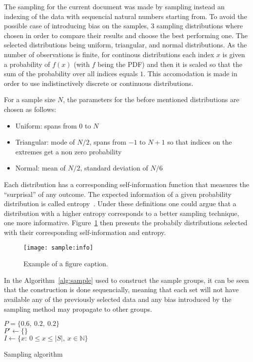\documentclass[journal]{IEEEtran}
\begin{document}
The sampling for the current document was made by sampling instead an indexing
of the data with sequencial natural numbers starting from. To avoid the possible
case of introducing bias on the samples, $3$ sampling distributions where chosen
in order to compare their results and choose the best performing one. The
selected distributions being uniform, triangular, and normal distributions. As
the number of observations is finite, for continous distributions each index $x$
is given a probability of $f(x)$ (with $f$ being the PDF) and then it is scaled
so that the sum of the probability over all indices equals $1$. This
accomodation is made in order to use indistinctively discrete or continuous
distributions.

For a sample size $N$, the parameters for the before mentioned distributions 
are chosen as follows:
\begin{itemize}
    \item Uniform: spans from $0$ to $N$
    \item Triangular: mode of $N/2$, spans from $-1$ to $N+1$ so that indices on
        the extremes get a non zero probability
    \item Normal: mean of $N/2$, standard deviation of $N/6$
\end{itemize} 

Each distribution has a corresponding self-information function that measures
the ``surprisal'' of any outcome. The expected information of a given
probability distribution is called entropy~\cite{information:borda}. Under these
definitions one could argue that a distribution with a higher entropy
corresponds to a better sampling technique, one more informative.
Figure~\ref{fig:sample:info} then presents the probabily distributions selected
with their corresponding self-information and entropy.

\begin{figure}[ht]
    \texttt{[image: sample:info]}
    \caption{Example of a figure caption. \label{fig:sample:info}}
\end{figure}

In the Algorithm~\ref{alg:sample} used to construct the sample groups, it can be
seen that the construction is done sequencially, meaning that each set will not
have available any of the previously selected data and any bias introduced by
the sampling method may propagate to other groups.

\begin{algorithm}[ht]
    $P = \{0.6,\ 0.2,\ 0.2\}$\\
    $P' \gets \{\}$\\
    $I \gets \{x:\ 0\leq x\leq \lvert S\rvert,\ x\in\mathbb{N}\}$\\
     \caption{Sampling algorithm\label{alg:sample}}
\end{algorithm}
\end{document}
